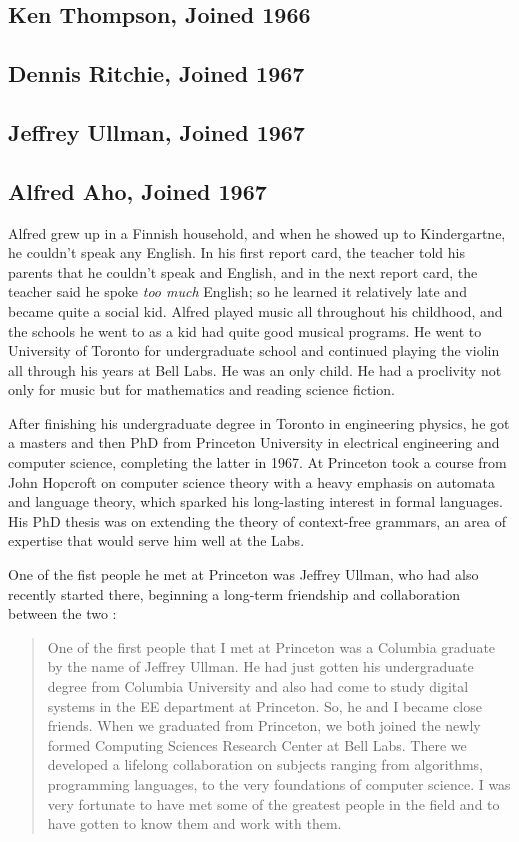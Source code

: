 \subsection{Ken Thompson, Joined 1966}



\subsection{Dennis Ritchie, Joined 1967}


\subsection{Jeffrey Ullman, Joined 1967}


\subsection{Alfred Aho, Joined 1967}

Alfred grew up in a Finnish household, and when he showed up to Kindergartne,
he couldn't speak any English.
In his first report card, the teacher told his parents that he couldn't speak and English,
and in the next report card, the teacher said he spoke \textit{too much} English;
so he learned it relatively late and became quite a social kid.
Alfred played music all throughout his childhood, and the schools he went to
as a kid had quite good musical programs.
He went to University of Toronto for undergraduate school and continued playing
the violin all through his years at Bell Labs. He was an only child. He had a
proclivity not only for music but for mathematics and reading science fiction.

After finishing his undergraduate degree in Toronto in engineering physics,
he got a masters and then PhD
from Princeton University in electrical engineering and computer science,
completing the latter in 1967.
At Princeton took a course from John Hopcroft on computer science theory with a heavy emphasis on
automata and language theory, which sparked his long-lasting interest in formal languages.
His PhD thesis was on extending the theory of context-free grammars, an area of
expertise that would serve him well at the Labs.

One of the fist people he met at Princeton was Jeffrey Ullman, who had also recently
started there, beginning a long-term friendship and collaboration between the two
\cite{aho_oral_history_2022}:

\begin{quotation}
	One of the first people that I met at Princeton was a Columbia graduate by the name of Jeffrey
	Ullman. He had just gotten his undergraduate degree from Columbia University and also had come to
	study digital systems in the EE department at Princeton. So, he and I became close friends. When we
	graduated from Princeton, we both joined the newly formed Computing Sciences Research Center at Bell
	Labs. There we developed a lifelong collaboration on subjects ranging from algorithms, programming
	languages, to the very foundations of computer science. I was very fortunate to have met some of the
	greatest people in the field and to have gotten to know them and work with them.
\end{quotation}

